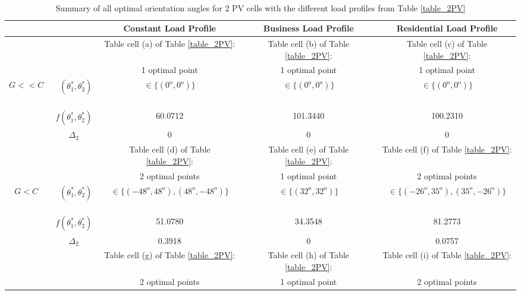 \begin{table}
 \centering
\captionsetup{justification=centering}
\caption{\\ Summary of all optimal orientation angles for 2 PV cells with the different load profiles from Table \ref{table_2PV} \label{opt_2PV}}
  \begin{tabular}
      {c|c||c|c|c} 
			\multicolumn{2}{c||}{}   &Constant Load Profile  &  Business Load Profile  &  Residential Load Profile  \\
			
      \hline\hline
			
			&&  Table cell (a) of Table \ref{table_2PV}:    &Table cell (b) of Table \ref{table_2PV}:     &Table cell (c) of Table \ref{table_2PV}:     \\  
			  & & 1 optimal point   & 1 optimal point  &1 optimal point   \\  
				
				$G<<C$ &  \  $(\theta_1^*,\theta_2^*)$ \  & $\in \{(0^\mathrm{o},0^\mathrm{o})\}$    & $\in \{(0^\mathrm{o},0^\mathrm{o})\}$ &$\in \{(0^\mathrm{o},0^\mathrm{o})\}$ \\\cline{2-5}		
				
					&   $f(\theta_1^*,\theta_2^*)$ &60.0712  &101.3440 &	100.2310\\\cline{2-5}	
					
					&  $\Delta_2$  &0  & 0 &0\\ \hline
					
					&&  Table cell (d) of Table \ref{table_2PV}:    &Table cell (e) of Table \ref{table_2PV}:     &Table cell (f) of Table \ref{table_2PV}:     \\  
				 & & 2 optimal points     & 1 optimal point   &2 optimal points    \\  
				
			$G<C$ &  \  $(\theta_1^*,\theta_2^*)$ \  &  $\in \{(-48^\mathrm{o},48^\mathrm{o}),(48^\mathrm{o},-48^\mathrm{o})\}$     & $\in \{(32^\mathrm{o},32^\mathrm{o})\}$  &$\in \{(-26^\mathrm{o},35^\mathrm{o}),(35^\mathrm{o},-26^\mathrm{o})\}$  \\\cline{2-5}	
	
	&    $f(\theta_1^*,\theta_2^*)$& 51.0780&  34.3548 & 81.2773\\\cline{2-5}	
		
		&  $\Delta_2$  &0.3918 &  0&	0.0757\\ \hline
				
				
				&&  Table cell (g) of Table \ref{table_2PV}:    &Table cell (h) of Table \ref{table_2PV}:     &Table cell (i) of Table \ref{table_2PV}:     \\  
				 &  &2 optimal points    & 1 optimal point    &2 optimal points    \\  
				

\end{tabular}
\end{table}
